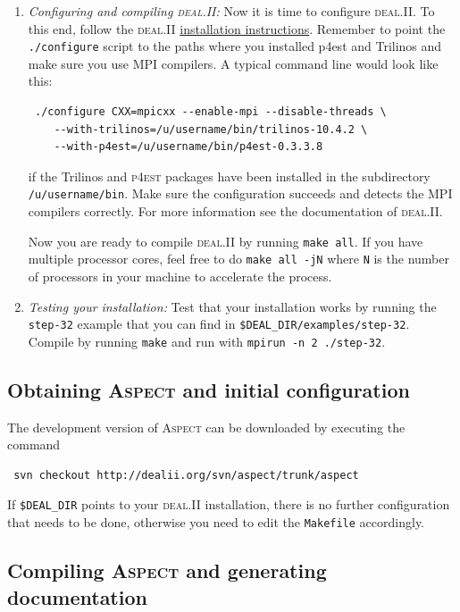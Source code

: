 \documentclass{article}
\newcommand{\dealii}{{\textsc{deal.II}}}
\newcommand{\pfrst}{{\normalfont\textsc{p4est}}}
\newcommand{\aspect}{\textsc{Aspect}}
\begin{document}
\begin{enumerate}
\item \textit{Configuring and compiling \dealii:} Now it is time to configure
  \dealii.
  To this end, follow the \dealii{}
  \href{http://www.dealii.org/developer/readme.html}{installation
    instructions}.
  Remember to point the {\tt{./configure}} script to the paths where
  you installed p4est and Trilinos and make sure you use MPI
  compilers. A typical command line would look like this:
\begin{verbatim}
 ./configure CXX=mpicxx --enable-mpi --disable-threads \
    --with-trilinos=/u/username/bin/trilinos-10.4.2 \
    --with-p4est=/u/username/bin/p4est-0.3.3.8
\end{verbatim}
  if the Trilinos and \pfrst{} packages have been installed in the
  subdirectory \texttt{/u/username/bin}.
  Make sure the configuration succeeds and detects the MPI compilers
  correctly. For more information see the documentation of \dealii.

  Now you are ready to compile \dealii{} by running {\tt{make all}}. If you
  have multiple processor cores, feel free to do {\tt{make all -jN}} where
  \texttt{N} is the number of processors in your machine to accelerate the
  process.

\item \textit{Testing your installation:} Test that your installation works
  by running the {\tt{step-32}} example that you can find in
  {\tt{\$DEAL\_DIR/examples/step-32}}. Compile by running {\tt{make}} and run
  with {\tt{mpirun -n 2 ./step-32}}.
\end{enumerate}


\subsection{Obtaining \aspect{} and initial configuration}

The development version of \aspect{} can be downloaded by executing the command
\begin{verbatim}
 svn checkout http://dealii.org/svn/aspect/trunk/aspect
\end{verbatim}
If {\tt{\$DEAL\_DIR}} points to your \dealii{} installation, there is no
further configuration that needs to be done, otherwise you need to edit
the {\tt{Makefile}} accordingly.


\subsection{Compiling \aspect{} and generating documentation}
\label{sec:compiling}
\end{document}
